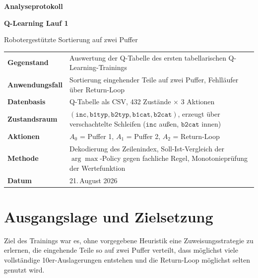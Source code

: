 \documentclass[11pt,a4paper]{article}
\newcommand{\inc}{\texttt{inc}}
\newcommand{\bit}{\texttt{b1typ}}
\newcommand{\bzt}{\texttt{b2typ}}
\newcommand{\bic}{\texttt{b1cat}}
\newcommand{\bzc}{\texttt{b2cat}}
\begin{document}
\begin{titlepage}
\centering
\vspace*{2cm}
{\Large\bfseries Analyseprotokoll\par}
\vspace{0.5cm}
{\LARGE\bfseries Q-Learning Lauf 1\par}
\vspace{0.4cm}
{\large Robotergestützte Sortierung auf zwei Puffer\par}
\vspace{2.5cm}

\begin{tabularx}{0.9\textwidth}{@{}lX@{}}
\toprule
\textbf{Gegenstand}      & Auswertung der Q-Tabelle des ersten tabellarischen
                           Q-Learning-Trainings \\[2pt]
\textbf{Anwendungsfall}  & Sortierung eingehender Teile auf zwei Puffer,
                           Fehlläufer über Return-Loop \\[2pt]
\textbf{Datenbasis}      & Q-Tabelle als CSV, 432 Zustände $\times$ 3 Aktionen \\[2pt]
\textbf{Zustandsraum}    & $(\inc,\bit,\bzt,\bic,\bzc)$, erzeugt über
                           verschachtelte Schleifen ($\inc$ außen, $\bzc$ innen) \\[2pt]
\textbf{Aktionen}        & $A_0$ = Puffer 1, $A_1$ = Puffer 2, $A_2$ = Return-Loop \\[2pt]
\textbf{Methode}         & Dekodierung des Zeilenindex, Soll-Ist-Vergleich der
                           $\arg\max$-Policy gegen fachliche Regel,
                           Monotonieprüfung der Wertefunktion \\[2pt]
\textbf{Datum}           & 21.\,August 2026 \\
\bottomrule
\end{tabularx}

\vfill
\end{titlepage}

\tableofcontents
\clearpage

\section{Ausgangslage und Zielsetzung}

Ziel des Trainings war es, ohne vorgegebene Heuristik eine Zuweisungsstrategie zu
erlernen, die eingehende Teile so auf zwei Puffer verteilt, dass möglichst viele
vollständige 10er-Auslagerungen entstehen und die Return-Loop möglichst selten
genutzt wird.
\end{document}
